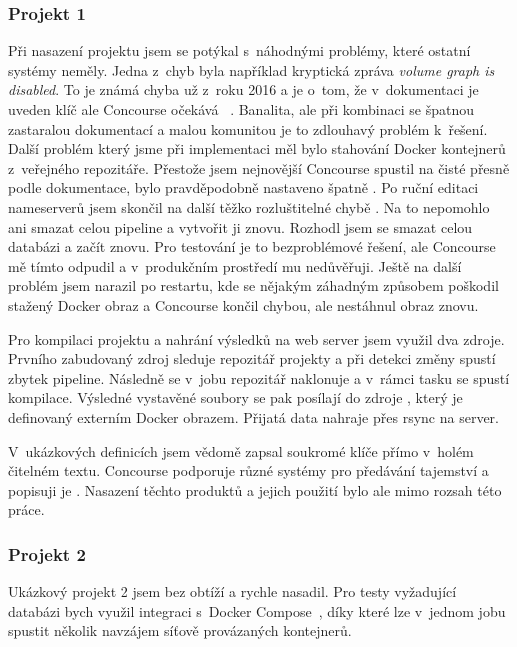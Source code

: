         \subsubsection{Projekt 1}
            Při nasazení projektu jsem se potýkal s~náhodnými problémy, které ostatní \CI systémy neměly. Jedna z~chyb byla například kryptická zpráva \textit{volume graph is disabled}. To je známá chyba už z~roku 2016 a je o~tom, že v~dokumentaci je uveden klíč  ale Concourse očekává ~\cite{concourse-issue-402}. Banalita, ale při kombinaci se špatnou zastaralou dokumentací a malou komunitou je to zdlouhavý problém k~řešení. Další problém který jsme při implementaci měl bylo stahování Docker kontejnerů z~veřejného repozitáře. Přestože jsem nejnovější Concourse spustil na čisté  přesně podle dokumentace, bylo pravděpodobně nastaveno špatně . Po ruční editaci nameserverů jsem skončil na další těžko rozluštitelné chybě . Na to nepomohlo ani smazat celou pipeline a vytvořit ji znovu. Rozhodl jsem se smazat celou databázi a začít znovu. Pro testování je to bezproblémové řešení, ale Concourse mě tímto odpudil a v~produkčním prostředí mu nedůvěřuji. Ještě na další problém jsem narazil po restartu, kde se nějakým záhadným způsobem poškodil stažený Docker obraz a Concourse končil chybou, ale nestáhnul obraz znovu.

            Pro kompilaci projektu a nahrání výsledků na web server jsem využil dva zdroje. Prvního zabudovaný zdroj  sleduje repozitář projekty a při detekci změny spustí zbytek pipeline. Následně se v~jobu repozitář naklonuje a v~rámci tasku se spustí kompilace. Výsledné vystavěné soubory se pak posílají do zdroje , který je definovaný externím Docker obrazem. Přijatá data nahraje přes rsync na server.

            V~ukázkových definicích jsem vědomě zapsal soukromé klíče přímo v~holém čitelném textu. Concourse podporuje různé systémy pro předávání tajemství a popisuji je . Nasazení těchto produktů a jejich použití bylo ale mimo rozsah této práce.

        \subsubsection{Projekt 2}
            Ukázkový projekt 2 jsem bez obtíží a rychle nasadil. Pro testy vyžadující databázi bych využil integraci s~Docker Compose~\cite{concourse-compose}, díky které lze v~jednom jobu spustit několik navzájem síťově provázaných kontejnerů.

